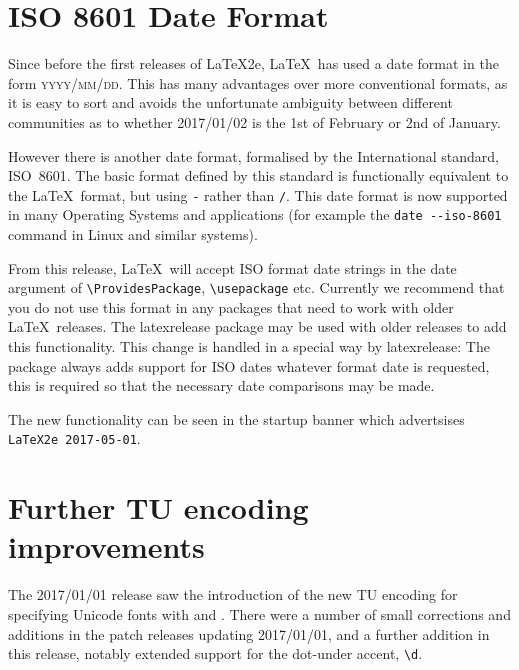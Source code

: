 \documentclass{ltnews}
\begin{document}
\maketitle
\tableofcontents

\setlength{}

\section{ISO 8601 Date Format}
Since before the first releases of \LaTeX2e, \LaTeX\ has used a date
format in the form \textsc{yyyy/mm/dd}. This has many advantages over more
conventional formats, as it is easy to sort and avoids the unfortunate
ambiguity between different communities as to whether 2017/01/02 is the
1st of February or 2nd of January.

However there is another date format, formalised by the
International standard, ISO~8601. The basic format defined by this
standard is functionally equivalent to the \LaTeX\ format, but using
\texttt{-} rather than \texttt{/}. This date format is now supported
in many Operating Systems and applications
(for example the \verb|date --iso-8601| command in Linux and similar systems).

From this release, \LaTeX\ will accept ISO format date strings in the
date argument of \verb|\ProvidesPackage|, \verb|\usepackage| etc.
Currently we recommend that you do not use this format in any packages
that need to work with older \LaTeX\ releases. 
The \textsf{latexrelease} package may be used with older releases to
 add this functionality. This change is handled in a special way  by
 \textsf{latexrelease}: The package always adds support for ISO dates
whatever format date is requested, this is required so that the
necessary date comparisons may be made.

The new functionality can be seen in the startup banner which
advertsises \texttt{LaTeX2e 2017-05-01}.

\section{Further TU encoding improvements}
The 2017/01/01 release saw the introduction of the new TU encoding for
specifying Unicode fonts with  and
. There were a number of small corrections and additions
in the patch releases updating 2017/01/01, and a further addition in
this release, notably extended support for the dot-under accent,
\verb|\d|.
\end{document}
